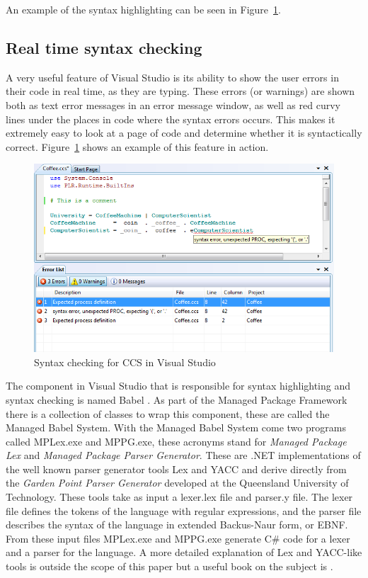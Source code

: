 	An example of the syntax highlighting can be seen in 
	Figure~\ref{fig:syntaxcheck}.
	
	\subsection{Real time syntax checking}\label{sec:syntax_checking}
	A very useful feature of Visual Studio is its ability to show the user 
	errors in their code in real time, as they are typing. These errors (or 
	warnings) are shown both as text error messages in an error message window, 
	as well as red curvy lines under the places in code where the syntax errors 
	occurs. This makes it extremely easy to look at a page of code and determine 
	whether it is syntactically correct. Figure~\ref{fig:syntaxcheck} shows an 
	example of this feature in action.
	
	\begin{figure}[h!]
		\centering
		\includegraphics[scale=0.5]{syntaxcheck.png}
		\caption{Syntax checking for CCS in Visual Studio}
		\label{fig:syntaxcheck}
	\end{figure}

	The component in Visual Studio that is responsible for syntax highlighting 
	and syntax checking is named Babel \cite{babel}. As part of the Managed 
	Package Framework there is a collection of classes to wrap this component, 
	these are called the Managed Babel System. With the Managed Babel System 
	come two programs called MPLex.exe and MPPG.exe, these acronyms stand for 
	\textit{Managed Package Lex} and \textit{Managed Package Parser Generator}. 
	These are .NET implementations of the well known parser generator tools Lex 
	and YACC and derive directly from the \textit{Garden Point Parser Generator} 
	\cite{gppg} developed at the Queensland University of Technology. These 
	tools take as input a \textsf{lexer.lex} file and \textsf{parser.y} file. 
	The lexer file defines the tokens of the language with regular expressions, 
	and the parser file describes the syntax of the language in extended 
	Backus-Naur form, or EBNF. From these input files MPLex.exe and MPPG.exe 
	generate C\# code for a lexer and a parser for the language. A more detailed 
	explanation of Lex and YACC-like tools is outside the scope of this paper 
	but a useful book on the subject is \cite{lexyacc}. 
	
